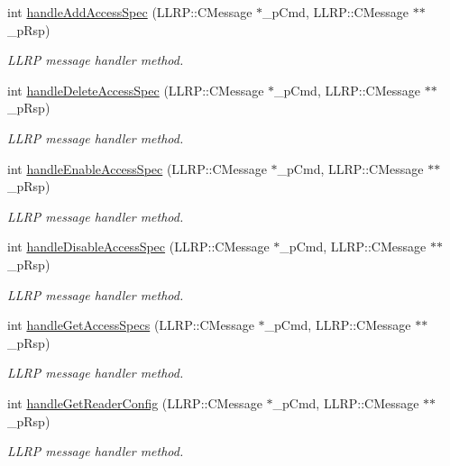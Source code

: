 \begin{DoxyCompactItemize}
int \hyperlink{class_e_l_f_i_n_1_1_l_l_r_p_core_a17bbb63e25368171f95c5f20055f7bc9}{handle\-Add\-Access\-Spec} (L\-L\-R\-P\-::\-C\-Message $\ast$\-\_\-p\-Cmd, L\-L\-R\-P\-::\-C\-Message $\ast$$\ast$\-\_\-p\-Rsp)
\begin{DoxyCompactList}\small\item\em L\-L\-R\-P message handler method. \end{DoxyCompactList}\item 
int \hyperlink{class_e_l_f_i_n_1_1_l_l_r_p_core_a04e40f0768473c1f30a475c8fd30134d}{handle\-Delete\-Access\-Spec} (L\-L\-R\-P\-::\-C\-Message $\ast$\-\_\-p\-Cmd, L\-L\-R\-P\-::\-C\-Message $\ast$$\ast$\-\_\-p\-Rsp)
\begin{DoxyCompactList}\small\item\em L\-L\-R\-P message handler method. \end{DoxyCompactList}\item 
int \hyperlink{class_e_l_f_i_n_1_1_l_l_r_p_core_aede685c6e02f5a531d554a98f03a040e}{handle\-Enable\-Access\-Spec} (L\-L\-R\-P\-::\-C\-Message $\ast$\-\_\-p\-Cmd, L\-L\-R\-P\-::\-C\-Message $\ast$$\ast$\-\_\-p\-Rsp)
\begin{DoxyCompactList}\small\item\em L\-L\-R\-P message handler method. \end{DoxyCompactList}\item 
int \hyperlink{class_e_l_f_i_n_1_1_l_l_r_p_core_ad3cb7e5ea78aebac7519ec7f49107f43}{handle\-Disable\-Access\-Spec} (L\-L\-R\-P\-::\-C\-Message $\ast$\-\_\-p\-Cmd, L\-L\-R\-P\-::\-C\-Message $\ast$$\ast$\-\_\-p\-Rsp)
\begin{DoxyCompactList}\small\item\em L\-L\-R\-P message handler method. \end{DoxyCompactList}\item 
int \hyperlink{class_e_l_f_i_n_1_1_l_l_r_p_core_a0fe9819cb4d6f4f2fe7db92bb9d4c6f7}{handle\-Get\-Access\-Specs} (L\-L\-R\-P\-::\-C\-Message $\ast$\-\_\-p\-Cmd, L\-L\-R\-P\-::\-C\-Message $\ast$$\ast$\-\_\-p\-Rsp)
\begin{DoxyCompactList}\small\item\em L\-L\-R\-P message handler method. \end{DoxyCompactList}\item 
int \hyperlink{class_e_l_f_i_n_1_1_l_l_r_p_core_a875e8917fc9f44232d1355f3d91a76e2}{handle\-Get\-Reader\-Config} (L\-L\-R\-P\-::\-C\-Message $\ast$\-\_\-p\-Cmd, L\-L\-R\-P\-::\-C\-Message $\ast$$\ast$\-\_\-p\-Rsp)
\begin{DoxyCompactList}\small\item\em L\-L\-R\-P message handler method. \end{DoxyCompactList}\item 

\end{DoxyCompactItemize}
